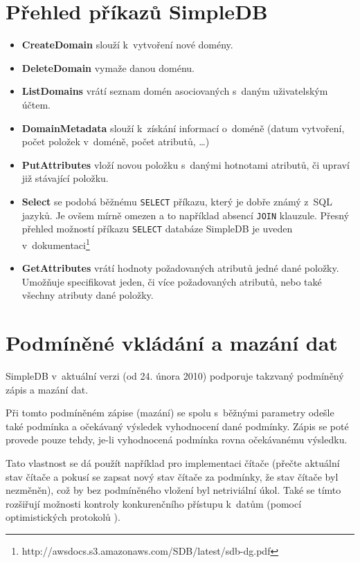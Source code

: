 \documentclass[oneside,12pt,final]{fithesis2}
\begin{document}
\section{Přehled příkazů SimpleDB}
\begin{itemize}
 \item \textbf{CreateDomain} slouží k~vytvoření nové domény.
 \item \textbf{DeleteDomain} vymaže danou doménu.
 \item \textbf{ListDomains} vrátí seznam domén asociovaných s~daným uživatelským účtem.
 \item \textbf{DomainMetadata} slouží k~získání informací o~doméně (datum vytvoření, počet položek v~doméně, počet atributů, \dots)
 \item \textbf{PutAttributes} vloží novou položku s~danými hotnotami atributů, či upraví již stávající položku.
 \item \textbf{Select} se podobá běžnému \verb<SELECT< příkazu, který je dobře známý z~SQL jazyků. Je ovšem mírně omezen a to například absencí \verb<JOIN< klauzule. Přesný přehled možností příkazu \verb<SELECT< databáze SimpleDB je uveden v~dokumentaci\footnote{http://awsdocs.s3.amazonaws.com/SDB/latest/sdb-dg.pdf}
 \item \textbf{GetAttributes} vrátí hodnoty požadovaných atributů jedné dané položky. Umožňuje specifikovat jeden, či více požadovaných atributů, nebo také všechny atributy dané položky.
\end{itemize}

\section{Podmíněné vkládání a mazání dat}
SimpleDB v~aktuální verzi (od 24. února 2010) podporuje takzvaný podmíněný zápis a mazání dat. 

Při tomto podmíněném zápise (mazání) se spolu s~běžnými parametry odešle také podmínka a očekávaný výsledek vyhodnocení dané podmínky. Zápis se poté provede pouze tehdy, je-li vyhodnocená podmínka rovna očekávanému výsledku.

Tato vlastnost se dá použít například pro implementaci čítače (přečte aktuální stav čítače a pokusí se zapsat nový stav čítače za podmínky, že stav čítače byl nezměněn), což by bez podmíněného vložení byl netriviální úkol. Také se tímto rozšiřují možnosti kontroly konkurenčního přístupu k~datům (pomocí optimistických protokolů ).
\end{document}
